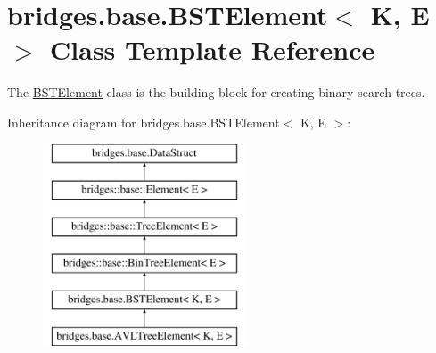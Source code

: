 \hypertarget{classbridges_1_1base_1_1_b_s_t_element}{}\section{bridges.\+base.\+B\+S\+T\+Element$<$ K, E $>$ Class Template Reference}
\label{classbridges_1_1base_1_1_b_s_t_element}


The \hyperlink{classbridges_1_1base_1_1_b_s_t_element}{B\+S\+T\+Element} class is the building block for creating binary search trees.  


Inheritance diagram for bridges.\+base.\+B\+S\+T\+Element$<$ K, E $>$\+:\begin{figure}[H]
\begin{center}
\leavevmode
\includegraphics[height=6.000000cm]{classbridges_1_1base_1_1_b_s_t_element}
\end{center}
\end{figure}
